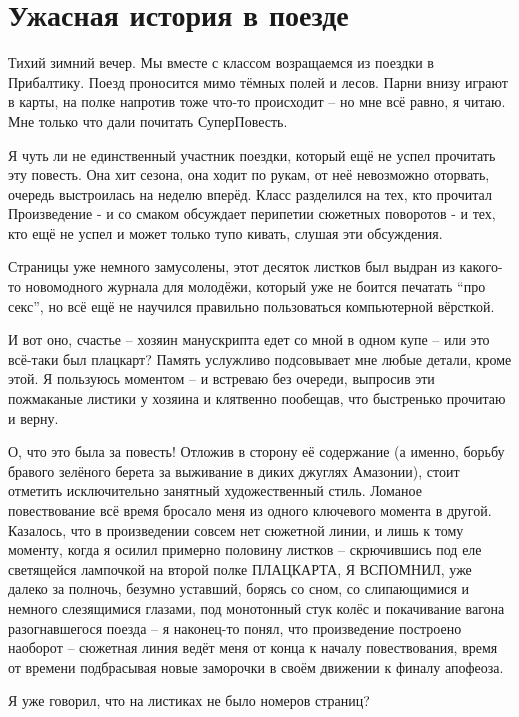 \chapter*{Ужасная история в поезде}
 

Тихий зимний вечер. Мы вместе с классом возращаемся
   из поездки в Прибалтику. Поезд проносится мимо тёмных полей и
   лесов. Парни внизу играют в карты, на полке напротив тоже что-то
   происходит – но мне всё равно, я читаю. Мне только что дали
   почитать СуперПовесть.
 

Я чуть ли не единственный участник поездки, который
   ещё не успел прочитать эту повесть. Она хит сезона, она ходит по
   рукам, от неё невозможно оторвать, очередь выстроилась на неделю
   вперёд. Класс разделился на тех, кто прочитал Произведение - и со
   смаком обсуждает перипетии сюжетных поворотов - и тех, кто ещё не
   успел и может только тупо кивать, слушая эти обсуждения.
 

Страницы уже немного замусолены, этот десяток
   листков был выдран из какого-то новомодного журнала для молодёжи,
   который уже не боится печатать “про секс”, но всё ещё не научился
   правильно пользоваться компьютерной вёрсткой.
 

И вот оно, счастье – хозяин манускрипта едет со
   мной в одном купе – или это всё-таки был плацкарт? Память услужливо
   подсовывает мне любые детали, кроме этой. Я пользуюсь моментом – и
   встреваю без очереди, выпросив эти пожмаканые листики у хозяина и
   клятвенно пообещав, что быстренько прочитаю и верну.
 

О, что это была за повесть! Отложив в сторону её
   содержание (а именно, борьбу бравого зелёного берета за выживание в
   диких джуглях Амазонии), стоит отметить исключительно занятный
   художественный стиль. Ломаное повествование всё время бросало меня
   из одного ключевого момента в другой. Казалось, что в произведении
   совсем нет сюжетной линии, и лишь к тому моменту, когда я осилил
   примерно половину листков – скрючившись под еле светящейся
   лампочкой на второй полке ПЛАЦКАРТА, Я ВСПОМНИЛ, уже далеко за
   полночь, безумно уставший, борясь со сном, со слипающимися и
   немного слезящимися глазами, под монотонный стук колёс и
   покачивание вагона разогнавшегося поезда – я наконец-то понял, что
   произведение построено наоборот – сюжетная линия ведёт меня от
   конца к началу повествования, время от времени подбрасывая новые
   заморочки в своём движении к финалу апофеоза.
 

Я уже говорил, что на листиках не было номеров
   страниц?
 


